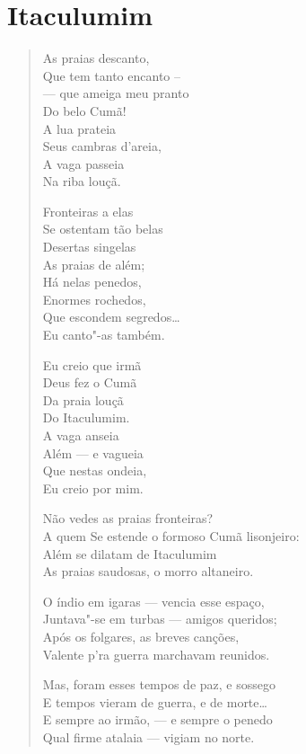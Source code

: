 \chapter{Itaculumim}

\begin{verse}
As praias descanto,\\
Que tem tanto encanto --\\
--- que ameiga meu pranto\\
Do belo Cumã!\\
A lua prateia\\
Seus cambras d'areia,\\
A vaga passeia\\
Na riba louçã.

Fronteiras a elas\\
Se ostentam tão belas\\
Desertas singelas\\
As praias de além;\\
Há nelas penedos,\\
Enormes rochedos,\\
Que escondem segredos\ldots{}\\
Eu canto"-as também.

Eu creio que irmã\\
Deus fez o Cumã\\
Da praia louçã\\
Do Itaculumim.\\
A vaga anseia\\
Além --- e vagueia\\
Que nestas ondeia,\\
Eu creio por mim.

Não vedes as praias fronteiras?\\
A quem Se estende o formoso Cumã lisonjeiro:\\
Além se dilatam de Itaculumim\\
As praias saudosas, o morro altaneiro.

O índio em igaras --- vencia esse espaço,\\
Juntava"-se em turbas --- amigos queridos;\\
Após os folgares, as breves canções,\\
Valente p'ra guerra marchavam reunidos.

Mas, foram esses tempos de paz, e sossego\\
E tempos vieram de guerra, e de morte\ldots{}\\
E sempre ao irmão, --- e sempre o penedo\\
Qual firme atalaia --- vigiam no norte.


\end{verse}
